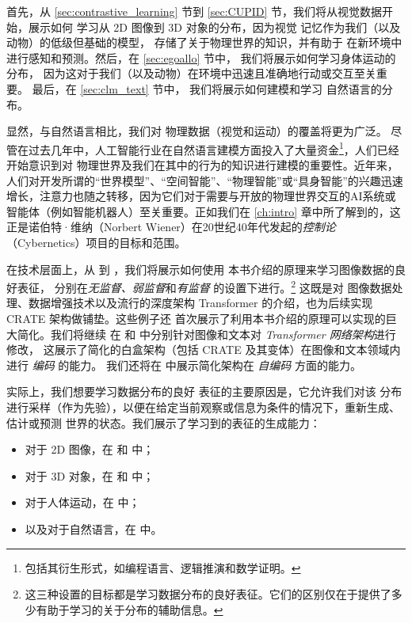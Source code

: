 \documentclass[../../book-main_zh.tex]{subfiles}
\begin{document}
首先，从 \ref{sec:contrastive_learning} 节到
\ref{sec:CUPID} 节，我们将从视觉数据开始，展示如何
学习从 2D 图像到 3D 对象的分布，因为视觉
记忆作为我们（以及动物）的低级但基础的模型，
存储了关于物理世界的知识，并有助于
在新环境中进行感知和预测。然后，在 \ref{sec:egoallo} 节中，
我们将展示如何学习身体运动的分布，
因为这对于我们（以及动物）在环境中迅速且准确地行动或交互至关重要。
最后，在 \ref{sec:clm_text} 节中，
我们将展示如何建模和学习
自然语言的分布。

显然，与自然语言相比，我们对
物理数据（视觉和运动）的覆盖将更为广泛。
尽管在过去几年中，人工智能行业在自然语言建模方面投入了大量资金\footnote{包括其衍生形式，如编程语言、逻辑推演和数学证明。}，人们已经开始意识到对
物理世界及我们在其中的行为的知识进行建模的重要性。近年来，人们对开发所谓的“世界模型”、“空间智能”、“物理智能”或“具身智能”的兴趣迅速增长，注意力也随之转移，因为它们对于需要与开放的物理世界交互的AI系统或智能体（例如智能机器人）至关重要。正如我们在 \ref{ch:intro} 章中所了解到的，这正是诺伯特·维纳（Norbert Wiener）在20世纪40年代发起的{\em 控制论}（Cybernetics）项目的目标和范围。

在技术层面上，从  到
，我们将展示如何使用
本书介绍的原理来学习图像数据的良好表征，
分别在{\em 无监督、弱监督}和{\em 有监督}
的设置下进行。\footnote{这三种设置的目标都是学习数据分布的良好表征。它们的区别仅在于提供了多少有助于学习的关于分布的辅助信息。} 这既是对
图像数据处理、数据增强技术以及流行的深度架构 Transformer 的介绍，也为后续实现 CRATE 架构做铺垫。这些例子还
首次展示了利用本书介绍的原理可以实现的巨大简化。我们将继续
在  和  中分别针对图像和文本对 \textit{Transformer 网络架构}进行修改，
这展示了简化的白盒架构（包括 CRATE 及其变体）在图像和文本领域内进行 \textit{编码} 的能力。
我们还将在  中展示简化架构在 \textit{自编码} 方面的能力。 %

实际上，我们想要学习数据分布的良好
表征的主要原因是，它允许我们对该
分布进行采样（作为先验），以便在给定当前观察或信息为条件的情况下，重新生成、估计或预测
世界的状态。我们展示了学习到的表征的生成能力：
\begin{itemize}
\item 对于 2D 图像，在  和
 中；
\item 对于 3D 对象，在
 和  中；
\item 对于人体运动，在  中；
\item 以及对于自然语言，在  中。
\end{itemize}
\end{document}
